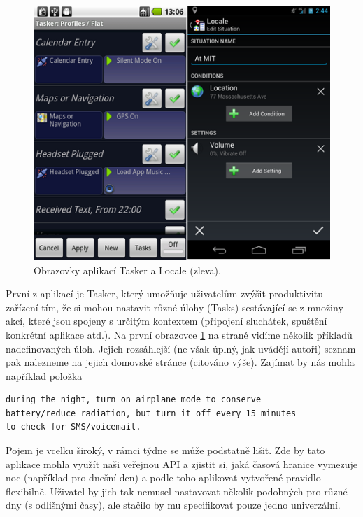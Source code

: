 \documentclass[thesis=M,czech]{FITthesis}[2012/06/26]
\begin{document}
\begin{figure}\centering
	\includegraphics[width=1\textwidth]{figures/similar_apps}
	\caption{Obrazovky aplikací Tasker\cite{tasker} a Locale\cite{locale} (zleva).}
	\label{fig:similar_apps}
\end{figure}

První z aplikací je Tasker\cite{tasker}, který umožňuje uživatelům zvýšit produktivitu zařízení tím, že si mohou nastavit různé úlohy (Tasks) sestávající se z množiny akcí, které jsou spojeny s určitým kontextem (připojení sluchátek, spuštění konkrétní aplikace atd.). Na první obrazovce \ref{fig:similar_apps} na straně \pageref{fig:similar_apps} vidíme několik příkladů nadefinovaných úloh. Jejich rozsáhlejší (ne však úplný, jak uvádějí autoři) seznam pak nalezneme na jejich domovské stránce (citováno výše). Zajímat by nás mohla například položka

\begin{verbatim}
during the night, turn on airplane mode to conserve 
battery/reduce radiation, but turn it off every 15 minutes 
to check for SMS/voicemail.
\end{verbatim}

Pojem  je vcelku široký, v rámci týdne se může podstatně lišit. Zde by tato aplikace mohla využít naši veřejnou API a zjistit si, jaká časová hranice vymezuje noc (například pro dnešní den) a podle toho aplikovat vytvořené pravidlo flexibilně. Uživatel by jich tak nemusel nastavovat několik podobných pro různé dny (s odlišnými časy), ale stačilo by mu specifikovat pouze jedno univerzální.
\end{document}
